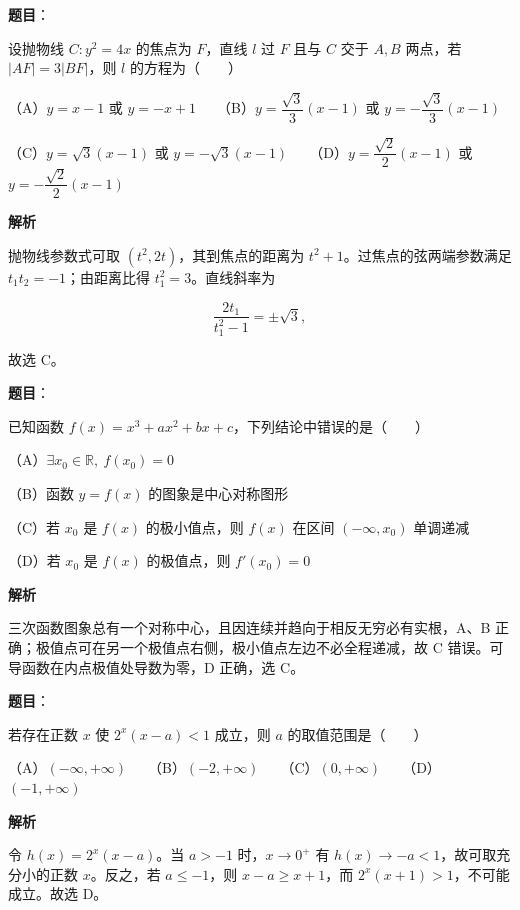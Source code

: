 \begin{answer}

\textbf{题目}：

设抛物线 $C:y^2=4x$ 的焦点为 $F$，直线 $l$ 过 $F$ 且与 $C$ 交于 $A,B$ 两点，若 $|AF|=3|BF|$，则 $l$ 的方程为\mbox{（　　）}

（A）$y=x-1$ 或 $y=-x+1$　　（B）$y=\dfrac{\sqrt3}{3}(x-1)$ 或 $y=-\dfrac{\sqrt3}{3}(x-1)$

（C）$y=\sqrt3(x-1)$ 或 $y=-\sqrt3(x-1)$　　（D）$y=\dfrac{\sqrt2}{2}(x-1)$ 或 $y=-\dfrac{\sqrt2}{2}(x-1)$

\textbf{解析}

抛物线参数式可取 $(t^2,2t)$，其到焦点的距离为 $t^2+1$。过焦点的弦两端参数满足 $t_1t_2=-1$；由距离比得 $t_1^2=3$。直线斜率为

\nopagebreak[4]
\[\frac{2t_1}{t_1^2-1}=\pm\sqrt3,\]

故选 C。


\end{answer}
\begin{answer}

\textbf{题目}：

已知函数 $f(x)=x^3+ax^2+bx+c$，下列结论中错误的是\mbox{（　　）}

（A）$\exists x_0\in\mathbb R,\ f(x_0)=0$

（B）函数 $y=f(x)$ 的图象是中心对称图形

（C）若 $x_0$ 是 $f(x)$ 的极小值点，则 $f(x)$ 在区间 $(-\infty,x_0)$ 单调递减

（D）若 $x_0$ 是 $f(x)$ 的极值点，则 $f'(x_0)=0$

\textbf{解析}

三次函数图象总有一个对称中心，且因连续并趋向于相反无穷必有实根，A、B 正确；极值点可在另一个极值点右侧，极小值点左边不必全程递减，故 C 错误。可导函数在内点极值处导数为零，D 正确，选 C。


\end{answer}
\begin{answer}

\textbf{题目}：

若存在正数 $x$ 使 $2^x(x-a)<1$ 成立，则 $a$ 的取值范围是\mbox{（　　）}

（A）$(-\infty,+\infty)$　　（B）$(-2,+\infty)$　　（C）$(0,+\infty)$　　（D）$(-1,+\infty)$

\textbf{解析}

令 $h(x)=2^x(x-a)$。当 $a>-1$ 时，$x\to0^+$ 有 $h(x)\to-a<1$，故可取充分小的正数 $x$。反之，若 $a\leqslant-1$，则 $x-a\geqslant x+1$，而 $2^x(x+1)>1$，不可能成立。故选 D。


\end{answer}

